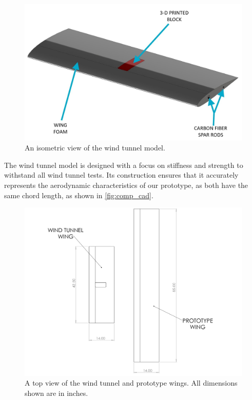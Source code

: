 \begin{figure}[htpb]
    \centering
    \includegraphics[width=0.88\linewidth]{figures/cad/TestWing_page-0001.jpg}
    \caption[Isometric View of the Wind Tunnel Model]{An isometric view of the wind tunnel model.}
    \label{fig:main_cad}
\end{figure}

\newpage

The wind tunnel model is designed with a focus on stiffness and strength to withstand all wind tunnel tests. Its construction ensures that it accurately represents the aerodynamic characteristics of our prototype, as both have the same chord length, as shown in \autoref{fig:comp_cad}.


\begin{figure}[htpb]
    \centering
    \includegraphics[width=\linewidth]{figures/cad/Wing Comparison_page-0001.jpg}
    \caption[Top View of Wind Tunnel Wing and Prototype Wing]{A top view of the wind tunnel and prototype wings. All dimensions shown are in inches.}
    \label{fig:comp_cad}
\end{figure}

